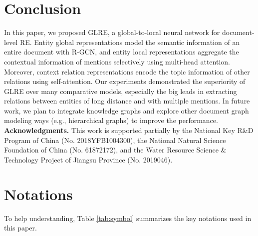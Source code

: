 \documentclass[11pt,a4paper]{article}
\begin{document}
\section{Conclusion}
\label{sect:concl}

In this paper, we proposed GLRE, a global-to-local neural network for document-level RE. Entity global representations model the semantic information of an entire document with R-GCN, and entity local representations aggregate the contextual information of mentions selectively using multi-head attention. Moreover, context relation representations encode the topic information of other relations using self-attention. Our experiments demonstrated the superiority of GLRE over many comparative models, especially the big leads in extracting relations between entities of long distance and with multiple mentions. In future work, we plan to integrate knowledge graphs and explore other document graph modeling ways (e.g., hierarchical graphs) to improve the performance.\\

\noindent\textbf{Acknowledgments.} This work is supported partially by the National Key R\&D Program of China (No. 2018YFB1004300), the National Natural Science Foundation of China (No. 61872172), and the Water Resource Science \& Technology Project of Jiangsu Province (No. 2019046).







\appendix

\section{Notations}

To help understanding, Table \ref{tab:symbol} summarizes the key notations used in this paper.
\end{document}
